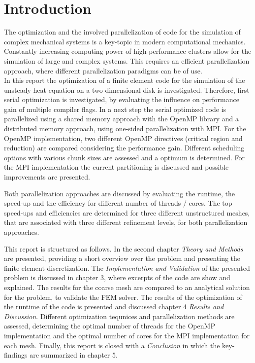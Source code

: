 \section{Introduction}

The optimization and the involved parallelization of code for the simulation of complex mechanical systems is a key-topic in modern computational mechanics. Constantly increasing computing power of high-performance clusters allow for the simulation of large and complex systems. This requires an efficient parallelization approach, where different parallelization paradigms can be of use. \\

In this report the optimization of a finite element code for the simulation of the unsteady heat equation on a two-dimensional disk is investigated. Therefore, first serial optimization is investigated, by evaluating the influence on performance gain of multiple compiler flags. In a next step the serial optimized code is parallelized using a shared memory approach with the OpenMP library and a distributed memory approach, using one-sided parallelization with MPI. For the OpenMP implementation, two different OpenMP directives (critical region and reduction) are compared considering the performance gain. Different scheduling options with various chunk sizes are assessed and a optimum is determined. For the MPI implementation the current partitioning is discussed and possible improvements are presented.

 Both parallelization approaches are discussed by evaluating the runtime, the speed-up and the efficiency for different number of threads / cores. The top speed-ups and efficiencies are determined for three different unstructured meshes, that are associated with three different refinement levels, for both parallelization approaches.  

 This report is structured as follows. In the second chapter \textit{Theory and Methods} are presented, providing a short overview over the problem and presenting the finite element discretization. The \textit{Implementation and Validation} of the presented problem is discussed in chapter 3, where excerpts of the code are show and explained. The results for the coarse mesh are compared to an analytical solution for the problem, to validate the FEM solver. The results of the optimization of the runtime of the code is presented and discussed chapter 4 \textit{Results and Discussion}. Different optimization tequnices and parallelization methods are assessed, determining the optimal number of threads for the OpenMP implementation and the optimal number of cores for the MPI implementation for each mesh.  Finally, this report is closed with a \textit{Conclusion} in which the key-findings are summarized in chapter 5.
